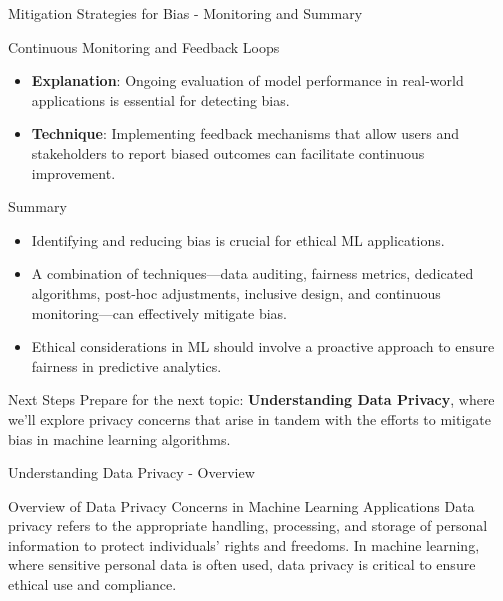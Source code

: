 \documentclass[aspectratio=169]{beamer}
\begin{document}
\begin{frame}[fragile]{Mitigation Strategies for Bias - Monitoring and Summary}
    \begin{block}{Continuous Monitoring and Feedback Loops}
        \begin{itemize}
            \item \textbf{Explanation}: Ongoing evaluation of model performance in real-world applications is essential for detecting bias.
            \item \textbf{Technique}: Implementing feedback mechanisms that allow users and stakeholders to report biased outcomes can facilitate continuous improvement.
        \end{itemize}
    \end{block}

    \begin{block}{Summary}
        \begin{itemize}
            \item Identifying and reducing bias is crucial for ethical ML applications.
            \item A combination of techniques—data auditing, fairness metrics, dedicated algorithms, post-hoc adjustments, inclusive design, and continuous monitoring—can effectively mitigate bias.
            \item Ethical considerations in ML should involve a proactive approach to ensure fairness in predictive analytics.
        \end{itemize}
    \end{block}
\end{frame}

\begin{frame}[fragile]{Next Steps}
    Prepare for the next topic: \textbf{Understanding Data Privacy}, where we'll explore privacy concerns that arise in tandem with the efforts to mitigate bias in machine learning algorithms.
\end{frame}

\begin{frame}[fragile]{Understanding Data Privacy - Overview}
    \begin{block}{Overview of Data Privacy Concerns in Machine Learning Applications}
        Data privacy refers to the appropriate handling, processing, and storage of personal information to protect individuals' rights and freedoms.
        In machine learning, where sensitive personal data is often used, data privacy is critical to ensure ethical use and compliance.
    \end{block}
\end{frame}
\end{document}
